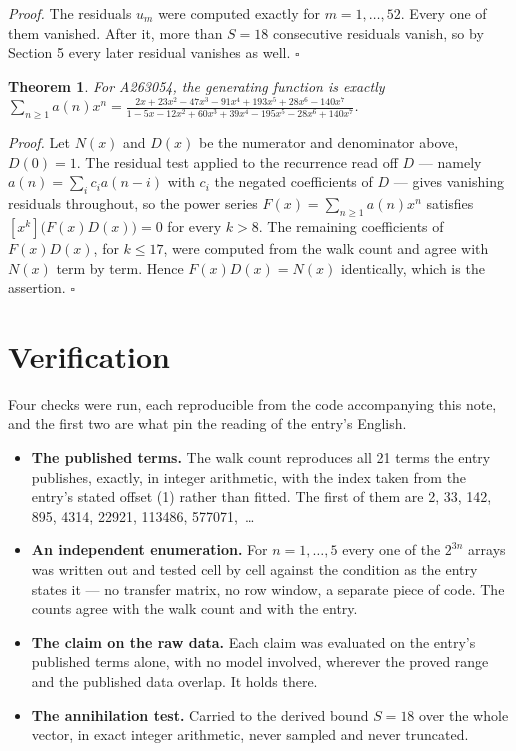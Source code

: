 \documentclass[11pt]{article}
\newtheorem{theorem}{Theorem}
\theoremstyle{definition}
\begin{document}
{\itshape Proof.} The residuals $u_m$ were computed exactly for $m = 1,\dots,52$. Every one of them vanished. After it, more than $S = 18$ consecutive residuals vanish, so by Section 5 every later residual vanishes as well. $\square$

\begin{theorem} For A263054, the generating function is exactly $\sum_{n\ge 1} a(n)x^n = \frac{2x + 23x^{2} - 47x^{3} - 91x^{4} + 193x^{5} + 28x^{6} - 140x^{7}}{1 - 5x - 12x^{2} + 60x^{3} + 39x^{4} - 195x^{5} - 28x^{6} + 140x^{7}}$.\end{theorem}

{\itshape Proof.} Let $N(x)$ and $D(x)$ be the numerator and denominator above, $D(0)=1$. The residual test applied to the recurrence read off $D$ --- namely $a(n) = \sum_i c_i a(n-i)$ with $c_i$ the negated coefficients of $D$ --- gives vanishing residuals throughout, so the power series $F(x)=\sum_{n\ge 1}a(n)x^n$ satisfies $[x^k]\bigl(F(x)D(x)\bigr) = 0$ for every $k > 8$. The remaining coefficients of $F(x)D(x)$, for $k \le 17$, were computed from the walk count and agree with $N(x)$ term by term. Hence $F(x)D(x) = N(x)$ identically, which is the assertion. $\square$

\section{Verification}

Four checks were run, each reproducible from the code accompanying this note, and the first two are what pin the reading of the entry's English.

\begin{itemize}

\item {\bfseries The published terms.} The walk count reproduces all 21 terms the entry publishes, exactly, in integer arithmetic, with the index taken from the entry's stated offset (1) rather than fitted. The first of them are 2, 33, 142, 895, 4314, 22921, 113486, 577071,~\dots

\item {\bfseries An independent enumeration.} For $n = 1,\dots,5$ every one of the $2^{3n}$ arrays was written out and tested cell by cell against the condition as the entry states it --- no transfer matrix, no row window, a separate piece of code. The counts agree with the walk count and with the entry.

\item {\bfseries The claim on the raw data.} Each claim was evaluated on the entry's published terms alone, with no model involved, wherever the proved range and the published data overlap. It holds there.

\item {\bfseries The annihilation test.} Carried to the derived bound $S = 18$ over the whole vector, in exact integer arithmetic, never sampled and never truncated.

\end{itemize}
\end{document}
